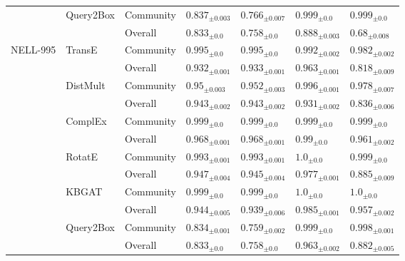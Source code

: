 \begin{table}[ht!]
\begin{adjustbox}{width=\textwidth}
\begin{tabular}{lllllll}
         & Query2Box & Community &  ${{0.837}_{\pm 0.003}}$ &  ${{0.766}_{\pm 0.007}}$ &    ${{0.999}_{\pm 0.0}}$ &    ${{0.999}_{\pm 0.0}}$ \\
         &           & Overall &    ${{0.833}_{\pm 0.0}}$ &    ${{0.758}_{\pm 0.0}}$ &  ${{0.888}_{\pm 0.003}}$ &   ${{0.68}_{\pm 0.008}}$ \\
\midrule
NELL-995 & TransE & Community &    ${{0.995}_{\pm 0.0}}$ &    ${{0.995}_{\pm 0.0}}$ &  ${{0.992}_{\pm 0.002}}$ &  ${{0.982}_{\pm 0.002}}$ \\
         &           & Overall &  ${{0.932}_{\pm 0.001}}$ &  ${{0.933}_{\pm 0.001}}$ &  ${{0.963}_{\pm 0.001}}$ &  ${{0.818}_{\pm 0.009}}$ \\
         & DistMult & Community &   ${{0.95}_{\pm 0.003}}$ &  ${{0.952}_{\pm 0.003}}$ &  ${{0.996}_{\pm 0.001}}$ &  ${{0.978}_{\pm 0.007}}$ \\
         &           & Overall &  ${{0.943}_{\pm 0.002}}$ &  ${{0.943}_{\pm 0.002}}$ &  ${{0.931}_{\pm 0.002}}$ &  ${{0.836}_{\pm 0.006}}$ \\
         & ComplEx & Community &    ${{0.999}_{\pm 0.0}}$ &    ${{0.999}_{\pm 0.0}}$ &    ${{0.999}_{\pm 0.0}}$ &    ${{0.999}_{\pm 0.0}}$ \\
         &           & Overall &  ${{0.968}_{\pm 0.001}}$ &  ${{0.968}_{\pm 0.001}}$ &     ${{0.99}_{\pm 0.0}}$ &  ${{0.961}_{\pm 0.002}}$ \\
         & RotatE & Community &  ${{0.993}_{\pm 0.001}}$ &  ${{0.993}_{\pm 0.001}}$ &      ${{1.0}_{\pm 0.0}}$ &    ${{0.999}_{\pm 0.0}}$ \\
         &           & Overall &  ${{0.947}_{\pm 0.004}}$ &  ${{0.945}_{\pm 0.004}}$ &  ${{0.977}_{\pm 0.001}}$ &  ${{0.885}_{\pm 0.009}}$ \\
         & KBGAT & Community &    ${{0.999}_{\pm 0.0}}$ &    ${{0.999}_{\pm 0.0}}$ &      ${{1.0}_{\pm 0.0}}$ &      ${{1.0}_{\pm 0.0}}$ \\
         &           & Overall &  ${{0.944}_{\pm 0.005}}$ &  ${{0.939}_{\pm 0.006}}$ &  ${{0.985}_{\pm 0.001}}$ &  ${{0.957}_{\pm 0.002}}$ \\
         & Query2Box & Community &  ${{0.834}_{\pm 0.001}}$ &  ${{0.759}_{\pm 0.002}}$ &    ${{0.999}_{\pm 0.0}}$ &  ${{0.998}_{\pm 0.001}}$ \\
         &           & Overall &    ${{0.833}_{\pm 0.0}}$ &    ${{0.758}_{\pm 0.0}}$ &  ${{0.963}_{\pm 0.002}}$ &  ${{0.882}_{\pm 0.005}}$ \\
\bottomrule
\end{tabular}
  \end{adjustbox}
\end{table}%


